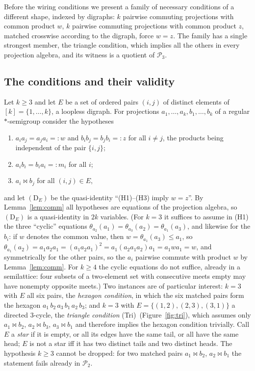 \documentclass[11pt]{amsart}
\theoremstyle{definition}
\renewcommand{\P}{\mathcal{P}}      %
\newcommand{\mt}{\bowtie}      %
\newcommand{\Tri}{\textup{(Tri)}}
\begin{document}
Before the wiring conditions we present a family of necessary conditions of a different shape, indexed by digraphs: $k$ pairwise commuting projections with common product $w$, $k$ pairwise commuting projections with common product $z$, matched crosswise according to the digraph, force $w=z$. The family has a single strongest member, the triangle condition, which implies all the others in every projection algebra, and its witness is a quotient of $\P_3$.

\subsection{The conditions and their validity}\label{subsec:DE}

Let $k\ge3$ and let $E$ be a set of ordered pairs $(i,j)$ of distinct elements of $[k]=\{1,\dots,k\}$, a loopless digraph. For projections $a_1,\dots,a_k,b_1,\dots,b_k$ of a regular $*$-semigroup consider the hypotheses
\begin{enumerate}[label=\textup{(H\arabic*)},leftmargin=3em,nosep]
\item $a_ia_j=a_ja_i=:w$ and $b_ib_j=b_jb_i=:z$ for all $i\ne j$, the products being independent of the pair $\{i,j\}$;
\item $a_ib_i=b_ia_i=:m_i$ for all $i$;
\item $a_i\mt b_j$ for all $(i,j)\in E$,
\end{enumerate}
and let $(\mathrm D_E)$ be the quasi-identity ``(H1)--(H3) imply $w=z$''. By Lemma~\ref{lem:comm} all hypotheses are equations of the projection algebra, so $(\mathrm D_E)$ is a quasi-identity in $2k$ variables. (For $k=3$ it suffices to assume in (H1) the three ``cyclic'' equations $\theta_{a_2}(a_1)=\theta_{a_3}(a_2)=\theta_{a_1}(a_3)$, and likewise for the $b_i$: if $w$ denotes the common value, then $w=\theta_{a_1}(a_3)\le a_1$, so $\theta_{a_1}(a_2)=a_1a_2a_1=(a_1a_2a_1)^2=a_1(a_2a_1a_2)a_1=a_1wa_1=w$, and symmetrically for the other pairs, so the $a_i$ pairwise commute with product $w$ by Lemma~\ref{lem:comm}. For $k\ge4$ the cyclic equations do not suffice, already in a semilattice: four subsets of a two-element set with consecutive meets empty may have nonempty opposite meets.) Two instances are of particular interest: $k=3$ with $E$ all six pairs, the \emph{hexagon condition}, in which the six matched pairs form the hexagon $a_1\,b_2\,a_3\,b_1\,a_2\,b_3$; and $k=3$ with $E=\{(1,2),(2,3),(3,1)\}$ a directed $3$-cycle, the \emph{triangle condition} \Tri\ (Figure~\ref{fig:tri}), which assumes only $a_1\mt b_2$, $a_2\mt b_3$, $a_3\mt b_1$ and therefore implies the hexagon condition trivially. Call $E$ a \emph{star} if it is empty, or all its edges have the same tail, or all have the same head; $E$ is not a star iff it has two distinct tails and two distinct heads. The hypothesis $k\ge3$ cannot be dropped: for two matched pairs $a_1\mt b_2$, $a_2\mt b_1$ the statement fails already in $\P_2$.
\end{document}
